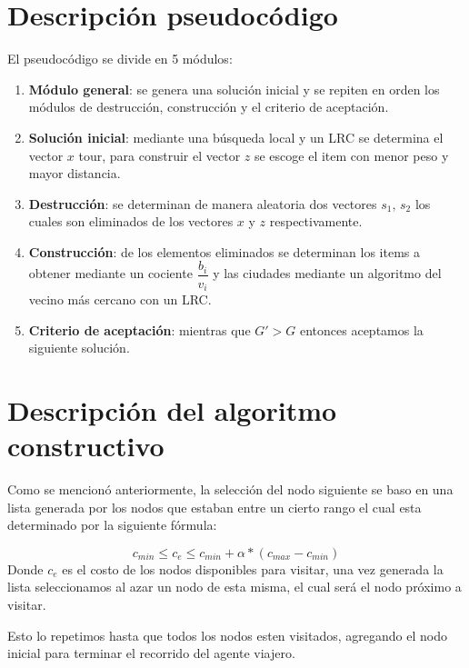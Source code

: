 \documentclass{article}
\theoremstyle{mytheoremstyle}
\theoremstyle{mytheoremstyle}
\theoremstyle{myproblemstyle}
\begin{document}
    \section{Descripción pseudocódigo}
    El pseudocódigo se divide en 5 módulos: 
    \begin{enumerate}
    	\item \textbf{Módulo general}: se genera una solución inicial y se repiten en orden los módulos de destrucción, construcción y el criterio de aceptación.
    	\item \textbf{Solución inicial}: mediante una búsqueda local y un LRC se determina el vector $x$ tour, para construir el vector $z$ se escoge el item con menor peso y mayor distancia.
    	\item \textbf{Destrucción}: se determinan de manera aleatoria dos vectores $s_1, \, s_2$ los cuales son eliminados de los vectores $x$ y $z$ respectivamente.
    	\item \textbf{Construcción}: de los elementos eliminados se determinan los items a obtener mediante un cociente $\dfrac{b_i}{v_i}$ y las ciudades mediante un algoritmo del vecino más cercano con un LRC.
    	\item \textbf{Criterio de aceptación}: mientras que $G' >  G$ entonces aceptamos la siguiente solución.  
    \end{enumerate}
    
    
    \section{Descripción del algoritmo constructivo}
    
    Como se mencionó anteriormente, la selección del nodo siguiente se baso en una lista generada por los nodos que estaban entre un cierto rango el cual esta determinado por la siguiente fórmula:
    
    \[ c_{min} \leq c_e \leq c_{min} + \alpha * (c_{max} - c_{min}) \]
    \newline
    Donde $c_e$ es el costo de los nodos disponibles para visitar, una vez generada la lista seleccionamos al azar un nodo de esta misma, el cual será el nodo próximo a visitar.
    
    Esto lo repetimos hasta que todos los nodos esten visitados, agregando el nodo inicial para terminar el recorrido del agente viajero.
    
\end{document}
